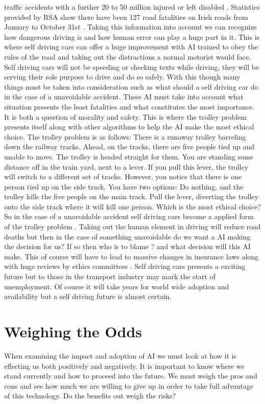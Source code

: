 \documentclass[conference]{IEEEtran}
\begin{document}
traffic accidents with a further 20 to 50 million injured or left disabled \cite{ASIRT}. Statistics provided by RSA show there have been 127 road fatalities on Irish roads from January to October 31st \cite{RSA}. Taking this information into account we can recognize how dangerous driving is and how human error can play a huge part in it. This is where self driving cars can offer a huge improvement with AI trained to obey the rules of the road and taking out the distractions a normal motorist would face. Self driving cars will not be speeding or checking texts while driving, they will be serving their sole purpose to drive and do so safely. With this though many things must be taken into consideration such as what should a self driving car do in the case of a unavoidable accident. These AI must take into account what situation presents the least fatalities and what constitutes the most importance. It is both a question of morality and safety. This is where the trolley problem presents itself along with other algorithms to help the AI make the most ethical choice. The trolley problem is as follows: There is a runaway trolley barreling down the railway tracks. Ahead, on the tracks, there are five people tied up and unable to move. The trolley is headed straight for them. You are standing some distance off in the train yard, next to a lever. If you pull this lever, the trolley will switch to a different set of tracks. However, you notice that there is one person tied up on the side track. You have two options: 
Do nothing, and the trolley kills the five people on the main track. 
Pull the lever, diverting the trolley onto the side track where it will kill one person.
Which is the most ethical choice? 
So in the case of a unavoidable accident self driving cars become a applied form of the trolley problem \cite{Trolley Problem}. Taking out the human element in driving will reduce road deaths but then in the case of something unavoidable do we want a AI making the decision for us? If so then who is to blame ? and what decision will this AI make. This of course will have to lead to massive changes in insurance laws along with huge reviews by ethics committees \cite{Law}. Self driving cars presents a exciting future but to those in the transport industry may mark the start of unemployment. Of course it will take years for world wide adoption and availability but a self driving future is almost certain. 

\section{Weighing the Odds}
When examining the impact and adoption of AI we must look at how it is effecting us both positively and negatively. It is important to know where we stand currently and how to proceed into the future. We must weigh the pros and cons and see how much we are willing to give up in order to take full advantage of this technology. Do the benefits out weigh the risks?
\end{document}
